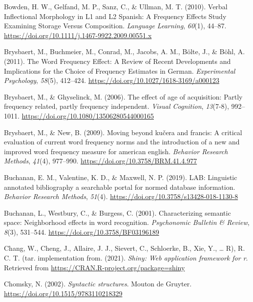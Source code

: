 \documentclass[
  english,
  man,floatsintext]{apa6}
\newlength{\cslhangindent}
\newenvironment{CSLReferences}[2] %
 {\begin{list}{}{%
  \setlength{\itemindent}{0pt}
  \setlength{\leftmargin}{0pt}
  \setlength{\parsep}{0pt}
  \ifodd #1
   \setlength{\leftmargin}{\cslhangindent}
   \setlength{\itemindent}{-1\cslhangindent}
  \fi
  \setlength{\itemsep}{#2\baselineskip}}}
 {\end{list}}
\begin{document}
\begin{CSLReferences}{1}{0}
Bowden, H. W., Gelfand, M. P., Sanz, C., \& Ullman, M. T. (2010). Verbal Inflectional Morphology in L1 and L2 Spanish: A Frequency Effects Study Examining Storage Versus Composition. \emph{Language Learning}, \emph{60}(1), 44--87. \url{https://doi.org/10.1111/j.1467-9922.2009.00551.x}

Brysbaert, M., Buchmeier, M., Conrad, M., Jacobs, A. M., Bölte, J., \& Böhl, A. (2011). The Word Frequency Effect: A Review of Recent Developments and Implications for the Choice of Frequency Estimates in German. \emph{Experimental Psychology}, \emph{58}(5), 412--424. \url{https://doi.org/10.1027/1618-3169/a000123}

Brysbaert, M., \& Ghyselinck, M. (2006). The effect of age of acquisition: Partly frequency related, partly frequency independent. \emph{Visual Cognition}, \emph{13}(7-8), 992--1011. \url{https://doi.org/10.1080/13506280544000165}

Brysbaert, M., \& New, B. (2009). Moving beyond ku{č}era and francis: A critical evaluation of current word frequency norms and the introduction of a new and improved word frequency measure for american english. \emph{Behavior Research Methods}, \emph{41}(4), 977--990. \url{https://doi.org/10.3758/BRM.41.4.977}

Buchanan, E. M., Valentine, K. D., \& Maxwell, N. P. (2019). LAB: Linguistic annotated bibliography {\textendash} a searchable portal for normed database information. \emph{Behavior Research Methods}, \emph{51}(4). \url{https://doi.org/10.3758/s13428-018-1130-8}

Buchanan, L., Westbury, C., \& Burgess, C. (2001). Characterizing semantic space: Neighborhood effects in word recognition. \emph{Psychonomic Bulletin \& Review}, \emph{8}(3), 531--544. \url{https://doi.org/10.3758/BF03196189}

Chang, W., Cheng, J., Allaire, J. J., Sievert, C., Schloerke, B., Xie, Y., \ldots{} R), R. C. T. (tar. implementation from. (2021). \emph{Shiny: Web application framework for r}. Retrieved from \url{https://CRAN.R-project.org/package=shiny}

Chomsky, N. (2002). \emph{Syntactic structures}. Mouton de Gruyter. \url{https://doi.org/10.1515/9783110218329}


\end{CSLReferences}
\end{document}
